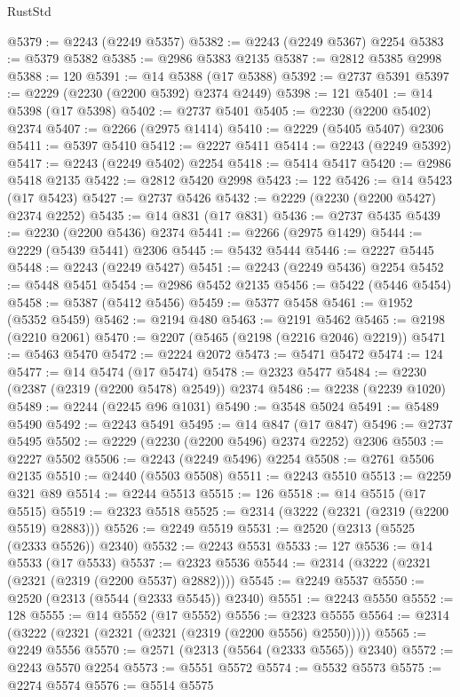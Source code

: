 \begin{lexlean}{RustStd}
\begin{coremodule}
@5379 := @2243 (@2249 @5357)
@5382 := @2243 (@2249 @5367) @2254
@5383 := @5379 @5382
@5385 := @2986 @5383 @2135
@5387 := @2812 @5385 @2998
@5388 := 120
@5391 := @14 @5388 (@17 @5388)
@5392 := @2737 @5391
@5397 := @2229 (@2230 (@2200 @5392) @2374 @2449)
@5398 := 121
@5401 := @14 @5398 (@17 @5398)
@5402 := @2737 @5401
@5405 := @2230 (@2200 @5402) @2374
@5407 := @2266 (@2975 @1414)
@5410 := @2229 (@5405 @5407) @2306
@5411 := @5397 @5410
@5412 := @2227 @5411
@5414 := @2243 (@2249 @5392)
@5417 := @2243 (@2249 @5402) @2254
@5418 := @5414 @5417
@5420 := @2986 @5418 @2135
@5422 := @2812 @5420 @2998
@5423 := 122
@5426 := @14 @5423 (@17 @5423)
@5427 := @2737 @5426
@5432 := @2229 (@2230 (@2200 @5427) @2374 @2252)
@5435 := @14 @831 (@17 @831)
@5436 := @2737 @5435
@5439 := @2230 (@2200 @5436) @2374
@5441 := @2266 (@2975 @1429)
@5444 := @2229 (@5439 @5441) @2306
@5445 := @5432 @5444
@5446 := @2227 @5445
@5448 := @2243 (@2249 @5427)
@5451 := @2243 (@2249 @5436) @2254
@5452 := @5448 @5451
@5454 := @2986 @5452 @2135
@5456 := @5422 (@5446 @5454)
@5458 := @5387 (@5412 @5456)
@5459 := @5377 @5458
@5461 := @1952 (@5352 @5459)
@5462 := @2194 @480
@5463 := @2191 @5462
@5465 := @2198 (@2210 @2061)
@5470 := @2207 (@5465 (@2198 (@2216 @2046) @2219))
@5471 := @5463 @5470
@5472 := @2224 @2072
@5473 := @5471 @5472
@5474 := 124
@5477 := @14 @5474 (@17 @5474)
@5478 := @2323 @5477
@5484 := @2230 (@2387 (@2319 (@2200 @5478) @2549)) @2374
@5486 := @2238 (@2239 @1020)
@5489 := @2244 (@2245 @96 @1031)
@5490 := @3548 @5024
@5491 := @5489 @5490
@5492 := @2243 @5491
@5495 := @14 @847 (@17 @847)
@5496 := @2737 @5495
@5502 := @2229 (@2230 (@2200 @5496) @2374 @2252) @2306
@5503 := @2227 @5502
@5506 := @2243 (@2249 @5496) @2254
@5508 := @2761 @5506 @2135
@5510 := @2440 (@5503 @5508)
@5511 := @2243 @5510
@5513 := @2259 @321 @89
@5514 := @2244 @5513
@5515 := 126
@5518 := @14 @5515 (@17 @5515)
@5519 := @2323 @5518
@5525 := @2314 (@3222 (@2321 (@2319 (@2200 @5519) @2883)))
@5526 := @2249 @5519
@5531 := @2520 (@2313 (@5525 (@2333 @5526)) @2340)
@5532 := @2243 @5531
@5533 := 127
@5536 := @14 @5533 (@17 @5533)
@5537 := @2323 @5536
@5544 := @2314 (@3222 (@2321 (@2321 (@2319 (@2200 @5537) @2882))))
@5545 := @2249 @5537
@5550 := @2520 (@2313 (@5544 (@2333 @5545)) @2340)
@5551 := @2243 @5550
@5552 := 128
@5555 := @14 @5552 (@17 @5552)
@5556 := @2323 @5555
@5564 := @2314 (@3222 (@2321 (@2321 (@2321 (@2319 (@2200 @5556) @2550)))))
@5565 := @2249 @5556
@5570 := @2571 (@2313 (@5564 (@2333 @5565)) @2340)
@5572 := @2243 @5570 @2254
@5573 := @5551 @5572
@5574 := @5532 @5573
@5575 := @2274 @5574
@5576 := @5514 @5575

\end{coremodule}
\end{lexlean}
